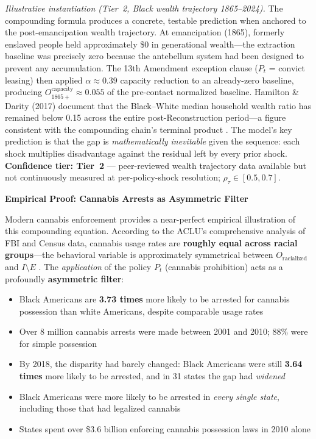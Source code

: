 \noindent\textit{Illustrative instantiation (Tier~2, Black wealth trajectory 1865--2024).} The compounding formula produces a concrete, testable prediction when anchored to the post-emancipation wealth trajectory. At emancipation (1865), formerly enslaved people held approximately \$0 in generational wealth---the extraction baseline was precisely zero because the antebellum system had been designed to prevent any accumulation. The 13th Amendment exception clause ($P_t$ = convict leasing) then applied $\alpha \approx 0.39$ capacity reduction to an already-zero baseline, producing $O_{1865+}^{\text{capacity}} \approx 0.055$ of the pre-contact normalized baseline. Hamilton \& Darity (2017) document that the Black--White median household wealth ratio has remained below 0.15 across the entire post-Reconstruction period---a figure consistent with the compounding chain's terminal product \cite{hamilton_darity_2017}. The model's key prediction is that the gap is \textit{mathematically inevitable} given the sequence: each shock multiplies disadvantage against the residual left by every prior shock. \textbf{Confidence tier: Tier~2} --- peer-reviewed wealth trajectory data available but not continuously measured at per-policy-shock resolution; $\rho_\tau \in [0.5, 0.7]$.

\textbf{Empirical Proof: Cannabis Arrests as Asymmetric Filter}

Modern cannabis enforcement provides a near-perfect empirical illustration of this compounding equation. According to the ACLU's comprehensive analysis of FBI and Census data, cannabis usage rates are \textbf{roughly equal across racial groups}---the behavioral variable is approximately symmetrical between $O_{\text{racialized}}$ and $I \setminus E$ \cite{aclu2013}. The \textit{application} of the policy $P_t$ (cannabis prohibition) acts as a profoundly \textbf{asymmetric filter}:

\begin{itemize}
    \item Black Americans are \textbf{3.73 times} more likely to be arrested for cannabis possession than white Americans, despite comparable usage rates \cite{aclu2013}
    \item Over 8 million cannabis arrests were made between 2001 and 2010; 88\% were for simple possession
    \item By 2018, the disparity had barely changed: Black Americans were still \textbf{3.64 times} more likely to be arrested, and in 31 states the gap had \textit{widened} \cite{aclu2020}
    \item Black Americans were more likely to be arrested in \textit{every single state}, including those that had legalized cannabis
    \item States spent over \$3.6 billion enforcing cannabis possession laws in 2010 alone
\end{itemize}


